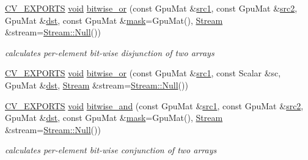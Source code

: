 \begin{DoxyCompactItemize}
\hyperlink{core_2types__c_8h_a1bf9f0e121b54272da02379cfccd0a2b}{C\-V\-\_\-\-E\-X\-P\-O\-R\-T\-S} \hyperlink{legacy_8hpp_a8bb47f092d473522721002c86c13b94e}{void} \hyperlink{namespacecv_1_1gpu_aa64153d4ffad093ed7a72e57bfc6d9f3}{bitwise\-\_\-or} (const Gpu\-Mat \&\hyperlink{core__c_8h_a897de4702c922f4cccda0d57ccdcafb3}{src1}, const Gpu\-Mat \&\hyperlink{core__c_8h_a7561a36d48069d54a6c8ac4e4750edfd}{src2}, Gpu\-Mat \&\hyperlink{photo__c_8h_aed13e2a25279b24dc954073233fef7a5}{dst}, const Gpu\-Mat \&\hyperlink{tracking_8hpp_a6b13ecd2fd6ec7ad422f1d7863c3ad19}{mask}=Gpu\-Mat(), \hyperlink{classcv_1_1gpu_1_1Stream}{Stream} \&stream=\hyperlink{classcv_1_1gpu_1_1Stream_af96c23564834f88333dcb8997df553f1}{Stream\-::\-Null}())
\begin{DoxyCompactList}\small\item\em calculates per-\/element bit-\/wise disjunction of two arrays \end{DoxyCompactList}\item 
\hyperlink{core_2types__c_8h_a1bf9f0e121b54272da02379cfccd0a2b}{C\-V\-\_\-\-E\-X\-P\-O\-R\-T\-S} \hyperlink{legacy_8hpp_a8bb47f092d473522721002c86c13b94e}{void} \hyperlink{namespacecv_1_1gpu_ac6714961be257316154a3af745b182f1}{bitwise\-\_\-or} (const Gpu\-Mat \&\hyperlink{core__c_8h_a897de4702c922f4cccda0d57ccdcafb3}{src1}, const Scalar \&sc, Gpu\-Mat \&\hyperlink{photo__c_8h_aed13e2a25279b24dc954073233fef7a5}{dst}, \hyperlink{classcv_1_1gpu_1_1Stream}{Stream} \&stream=\hyperlink{classcv_1_1gpu_1_1Stream_af96c23564834f88333dcb8997df553f1}{Stream\-::\-Null}())
\item 
\hyperlink{core_2types__c_8h_a1bf9f0e121b54272da02379cfccd0a2b}{C\-V\-\_\-\-E\-X\-P\-O\-R\-T\-S} \hyperlink{legacy_8hpp_a8bb47f092d473522721002c86c13b94e}{void} \hyperlink{namespacecv_1_1gpu_a0a780eb333321158a41ebdc68e014816}{bitwise\-\_\-and} (const Gpu\-Mat \&\hyperlink{core__c_8h_a897de4702c922f4cccda0d57ccdcafb3}{src1}, const Gpu\-Mat \&\hyperlink{core__c_8h_a7561a36d48069d54a6c8ac4e4750edfd}{src2}, Gpu\-Mat \&\hyperlink{photo__c_8h_aed13e2a25279b24dc954073233fef7a5}{dst}, const Gpu\-Mat \&\hyperlink{tracking_8hpp_a6b13ecd2fd6ec7ad422f1d7863c3ad19}{mask}=Gpu\-Mat(), \hyperlink{classcv_1_1gpu_1_1Stream}{Stream} \&stream=\hyperlink{classcv_1_1gpu_1_1Stream_af96c23564834f88333dcb8997df553f1}{Stream\-::\-Null}())
\begin{DoxyCompactList}\small\item\em calculates per-\/element bit-\/wise conjunction of two arrays \end{DoxyCompactList}\item 

\end{DoxyCompactItemize}
